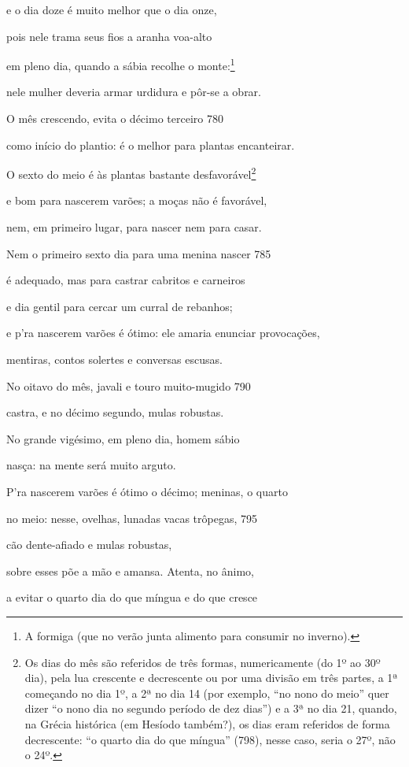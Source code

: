 e o dia doze é muito melhor que o dia onze,

pois nele trama seus fios a aranha voa-alto

em pleno dia, quando a sábia recolhe o monte:\footnote{A formiga (que no verão junta alimento para consumir no inverno).}

nele mulher deveria armar urdidura e pôr-se a obrar.

O mês crescendo, evita o décimo terceiro \num{780}

como início do plantio: é o melhor para plantas encanteirar.

O sexto do meio é às plantas bastante desfavorável\footnote{Os dias do mês são referidos de três formas, numericamente (do 1º
ao 30º dia), pela lua crescente e decrescente ou por uma divisão em três
partes, a 1ª começando no dia 1º, a 2ª no dia 14 (por exemplo, ``no nono
do meio'' quer dizer ``o nono dia no segundo período de dez dias'') e a
3ª no dia 21, quando, na Grécia histórica (em Hesíodo também?), os dias
eram referidos de forma decrescente: ``o quarto dia do que míngua''
(798), nesse caso, seria o 27º, não o 24º.}

e bom para nascerem varões; a moças não é favorável,

nem, em primeiro lugar, para nascer nem para casar.

Nem o primeiro sexto dia para uma menina nascer \num{785}

é adequado, mas para castrar cabritos e carneiros

e dia gentil para cercar um curral de rebanhos;

e p'ra nascerem varões é ótimo: ele amaria enunciar \qb{}provocações,

mentiras, contos solertes e conversas escusas.

No oitavo do mês, javali e touro muito-mugido \num{790}

castra, e no décimo segundo, mulas robustas.

No grande vigésimo, em pleno dia, homem sábio

nasça: na mente será muito arguto.

P'ra nascerem varões é ótimo o décimo; meninas, o quarto

no meio: nesse, ovelhas, lunadas vacas trôpegas, \num{795}

cão dente-afiado e mulas robustas,

sobre esses põe a mão e amansa. Atenta, no ânimo,

a evitar o quarto dia do que míngua e do que cresce

